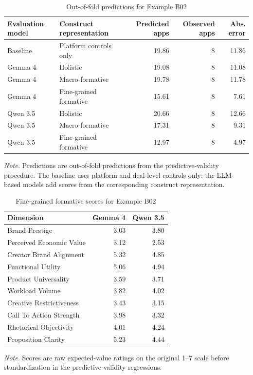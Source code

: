 \begin{table}[htbp]
\centering
\small
\caption{Out-of-fold predictions for Example B02}
\label{tab:barter_example_b02_predictions}
\begin{tabular}{@{}llrrr@{}}
\toprule
Evaluation model & Construct representation & Predicted apps & Observed apps & Abs. error \\
\midrule
Baseline & Platform controls only & 19.86 & 8 & 11.86 \\
\addlinespace
Gemma 4 & Holistic & 19.08 & 8 & 11.08 \\
Gemma 4 & Macro-formative & 19.78 & 8 & 11.78 \\
Gemma 4 & Fine-grained formative & 15.61 & 8 & 7.61 \\
\addlinespace
Qwen 3.5 & Holistic & 20.66 & 8 & 12.66 \\
Qwen 3.5 & Macro-formative & 17.31 & 8 & 9.31 \\
Qwen 3.5 & Fine-grained formative & 12.97 & 8 & 4.97 \\
\bottomrule
\end{tabular}

\begin{flushleft}
\footnotesize
\textit{Note.} Predictions are out-of-fold predictions from the predictive-validity procedure. The baseline uses platform and deal-level controls only; the LLM-based models add scores from the corresponding construct representation.
\end{flushleft}
\end{table}



\begin{table}[htbp]
\centering
\small
\caption{Fine-grained formative scores for Example B02}
\label{tab:barter_example_b02_scores}
\begin{tabular}{@{}lrr@{}}
\toprule
Dimension & Gemma 4 & Qwen 3.5 \\
\midrule
Brand Prestige & 3.03 & 3.80 \\
Perceived Economic Value & 3.12 & 2.53 \\
Creator Brand Alignment & 5.32 & 4.85 \\
Functional Utility & 5.06 & 4.94 \\
Product Universality & 3.59 & 3.71 \\
Workload Volume & 3.82 & 4.02 \\
Creative Restrictiveness & 3.43 & 3.15 \\
Call To Action Strength & 3.98 & 3.32 \\
Rhetorical Objectivity & 4.01 & 4.24 \\
Proposition Clarity & 5.23 & 4.44 \\
\bottomrule
\end{tabular}

\begin{flushleft}
\footnotesize
\textit{Note.} Scores are raw expected-value ratings on the original 1--7 scale before standardization in the predictive-validity regressions.
\end{flushleft}
\end{table}



